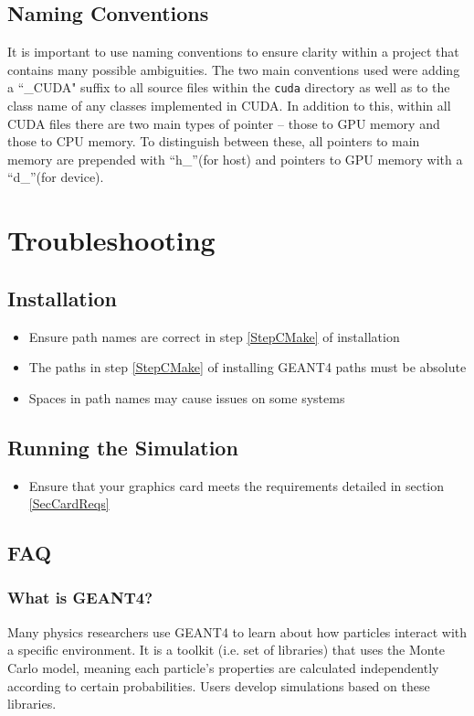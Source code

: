 \documentclass[12pt]{article}
\begin{document}
\subsection{Naming Conventions} %
It is important to use naming conventions to ensure clarity within a project that contains many possible ambiguities. The two main conventions used were adding a ``\_CUDA" suffix to all source files within the \texttt{cuda} directory as well as to the class name of any classes implemented in CUDA. In addition to this, within all CUDA files there are two main types of pointer -- those to GPU memory and those to CPU memory. To distinguish between these, all pointers to main memory are prepended with ``h\_''(for host) and pointers to GPU memory with a ``d\_''(for device).

\section{Troubleshooting}\label{SecTroubleshooting} %
\subsection{Installation} %
\begin{itemize}
\item Ensure path names are correct in step \ref{StepCMake} of installation
\item The paths in step \ref{StepCMake} of installing GEANT4 paths must be absolute
\item Spaces in path names may cause issues on some systems
\end{itemize}

\subsection{Running the Simulation} %
\begin{itemize}
\item Ensure that your graphics card meets the requirements detailed in section \ref{SecCardReqs}
\end{itemize}

\subsection{FAQ} %
\subsubsection{What is GEANT4?}\label{SecBackground}
Many physics researchers use GEANT4 to learn about how particles interact with a specific environment. It is a toolkit (i.e. set of libraries) that uses the Monte Carlo model, meaning each particle's properties are calculated independently according to certain probabilities. Users develop simulations based on these libraries.
\end{document}
